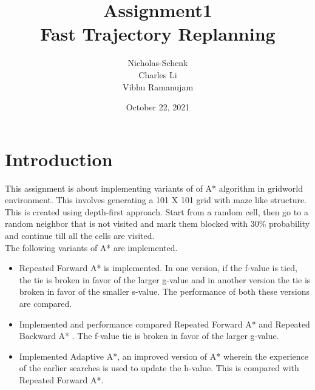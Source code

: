 \documentclass[12pt]{article}
\title{Assignment1 \\
Fast Trajectory Replanning}
\author{Nicholas-Schenk\\
Charles Li\\
Vibhu Ramanujam}
\date{October 22, 2021}
\begin{document}
\maketitle


\newpage



\section*{Introduction}
This assignment is about implementing variants of of A* algorithm in gridworld environment. This involves generating a 101 X 101 grid with maze like structure. This is created using depth-first approach. Start from a random cell, then go to a random neighbor that is not visited and mark them blocked with 30\% probability and continue till all the cells are visited.
\\
The following variants of A* are implemented.
  \begin{itemize}
    \item 
      \begin{flushleft}
        Repeated Forward A* is implemented. In one version, if the f-value is tied, the tie is broken in favor of the larger g-value and in another version the tie is broken in favor of the smaller s-value. The performance of both these versions are compared.
        \end{flushleft}
    \item
		\begin{flushleft}
        Implemented and performance compared Repeated Forward A* and Repeated Backward A* . The f-value tie is broken in favor of the larger g-value.
         \end{flushleft}
     \item
		\begin{flushleft}
        Implemented Adaptive A*, an improved version of A* wherein the experience of the earlier searches is used to update the h-value. This is compared with Repeated Forward A*.
        \end{flushleft}
      
 \end{itemize}
      
\end{document}
